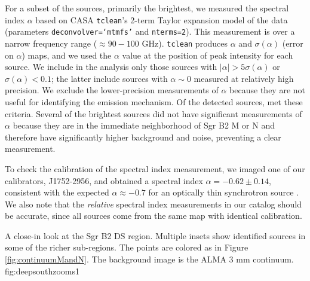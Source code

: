 \documentclass[twocolumn]{aastex61}
\begin{document}

For a subset of the sources, primarily the brightest, we measured the spectral
index $\alpha$ based on CASA \texttt{tclean}'s  2-term Taylor expansion model
of the data (parameters \texttt{deconvolver=`mtmfs'} and \texttt{nterms=2}).
This measurement is over a narrow frequency range ($\approx90-100$ GHz).
\texttt{tclean} produces $\alpha$ and $\sigma(\alpha)$ (error on $\alpha$)
maps, and we used the $\alpha$ value at the position of peak intensity for each
source.  We include in the analysis only those sources with $|\alpha| > 5
\sigma(\alpha)$ or $\sigma(\alpha) < 0.1$; the latter include sources with
$\alpha\sim0$ measured at relatively high precision.  We exclude the lower-precision
measurements of $\alpha$ because they are not useful for identifying the emission
mechanism.  Of the \ncores detected sources, \nalphas met these
criteria. Several of the brightest sources did not have significant
measurements of $\alpha$ because they are in the immediate neighborhood of Sgr
B2 M or N and therefore have significantly higher background and noise,
preventing a clear measurement.

To check the calibration of the spectral index measurement, we imaged one of
our calibrators, J1752-2956, and obtained a spectral index
$\alpha=-0.62\pm0.14$, consistent with the expected $\alpha\approx-0.7$ for an
optically thin synchrotron source \citep[e.g.,][]{Condon2007a}.  We also note
that the \emph{relative} spectral index measurements in our catalog should be
accurate, since all sources come from the same map with identical calibration.

{A close-in look at the Sgr B2 DS region.  Multiple insets show identified sources
in some of the richer sub-regions.  The points are colored as in Figure
\ref{fig:continuumMandN}.  The background image is the ALMA 3 mm continuum.}
{fig:deepsouthzooms}{1}{\textwidth}
\end{document}
